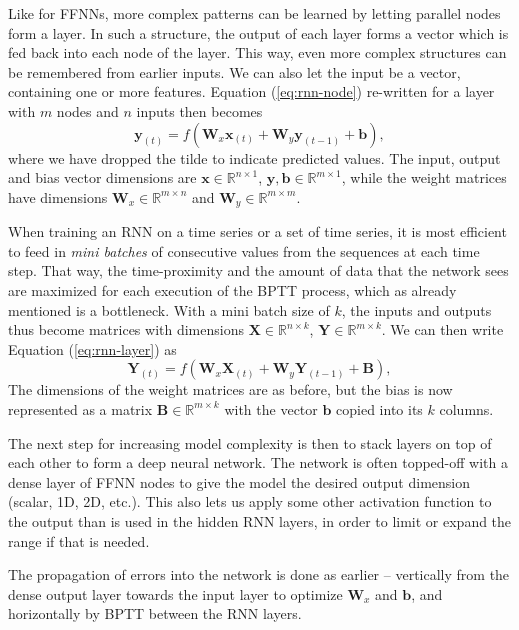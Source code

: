 \documentclass[]{article}
\begin{document}
Like for FFNNs, more complex patterns can be learned by letting parallel nodes form a layer. In such a structure, the output of each layer forms a vector which is fed back into each node of the layer. This way, even more complex structures can be remembered from earlier inputs. We can also let the input be a vector, containing one or more features. Equation (\ref{eq:rnn-node}) re-written for a layer with $m$ nodes and $n$ inputs then becomes
\begin{equation} \label{eq:rnn-layer}
	\mathbf{y}_{(t)} = f(\mathbf{W}_x \mathbf{x}_{(t)} + \mathbf{W}_y \mathbf{y}_{(t-1)} + \mathbf{b}),
\end{equation} 
where we have dropped the tilde to indicate predicted values. The input, output and bias vector dimensions are $\mathbf{x} \in \mathbb{R}^{n \times 1}$, $\mathbf{y}, \mathbf{b} \in \mathbb{R}^{m \times 1}$, while the weight matrices have dimensions $\mathbf{W}_x \in \mathbb{R}^{m \times n}$ and $\mathbf{W}_y \in \mathbb{R}^{m \times m}$.

When training an RNN on a time series or a set of time series, it is most efficient to feed in \textit{mini batches} of consecutive values from the sequences at each time step. That way, the time-proximity and the amount of data that the network sees are maximized for each execution of the BPTT process, which as already mentioned is a bottleneck. With a mini batch size of $k$, the inputs and outputs thus become matrices with dimensions $\mathbf{X} \in \mathbb{R}^{n \times k}$, $\mathbf{Y} \in \mathbb{R}^{m \times k}$. We can then write Equation (\ref{eq:rnn-layer}) as
\begin{equation} \label{eq:rnn-layer-seq}
	\mathbf{Y}_{(t)} = f(\mathbf{W}_x \mathbf{X}_{(t)} + \mathbf{W}_y \mathbf{Y}_{(t-1)} + \mathbf{B}),
\end{equation} 
The dimensions of the weight matrices are as before, but the bias is now represented as a matrix $\mathbf{B} \in \mathbb{R}^{m \times k}$ with the vector $\mathbf{b}$ copied into its $k$ columns.

The next step for increasing model complexity is then to stack layers on top of each other to form a deep neural network. The network is often topped-off with a dense layer of FFNN nodes to give the model the desired output dimension (scalar, 1D, 2D, etc.). This also lets us apply some other activation function to the output than is used in the hidden RNN layers, in order to limit or expand the range if that is needed. 

The propagation of errors into the network is done as earlier -- vertically from the dense output layer towards the input layer to optimize $\mathbf{W}_x$ and $\mathbf{b}$, and horizontally by BPTT between the RNN layers. 
\end{document}
